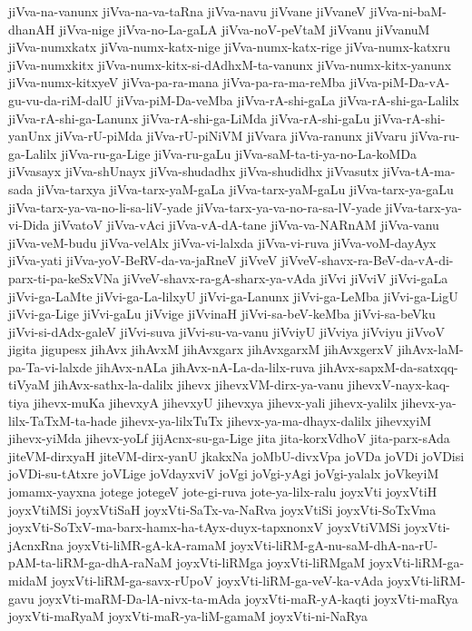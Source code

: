 {jiVva-na-vanunx
jiVva-na-va-taRna
jiVva-navu
jiVvane
jiVvaneV
jiVva-ni-baM-dhanAH
jiVva-nige
jiVva-no-La-gaLA
jiVva-noV-peVtaM
jiVvanu
jiVvanuM
jiVva-numxkatx
jiVva-numx-katx-nige
jiVva-numx-katx-rige
jiVva-numx-katxru
jiVva-numxkitx
jiVva-numx-kitx-si-dAdhxM-ta-vanunx
jiVva-numx-kitx-yanunx
jiVva-numx-kitxyeV
jiVva-pa-ra-mana
jiVva-pa-ra-ma-reMba
jiVva-piM-Da-vA-gu-vu-da-riM-dalU
jiVva-piM-Da-veMba
jiVva-rA-shi-gaLa
jiVva-rA-shi-ga-Lalilx
jiVva-rA-shi-ga-Lanunx
jiVva-rA-shi-ga-LiMda
jiVva-rA-shi-gaLu
jiVva-rA-shi-yanUnx
jiVva-rU-piMda
jiVva-rU-piNiVM
jiVvara
jiVva-ranunx
jiVvaru
jiVva-ru-ga-Lalilx
jiVva-ru-ga-Lige
jiVva-ru-gaLu
jiVva-saM-ta-ti-ya-no-La-koMDa
jiVvasayx
jiVva-shUnayx
jiVva-shudadhx
jiVva-shudidhx
jiVvasutx
jiVva-tA-ma-sada
jiVva-tarxya
jiVva-tarx-yaM-gaLa
jiVva-tarx-yaM-gaLu
jiVva-tarx-ya-gaLu
jiVva-tarx-ya-va-no-li-sa-liV-yade
jiVva-tarx-ya-va-no-ra-sa-lV-yade
jiVva-tarx-ya-vi-Dida
jiVvatoV
jiVva-vAci
jiVva-vA-dA-tane
jiVva-va-NARnAM
jiVva-vanu
jiVva-veM-budu
jiVva-velAlx
jiVva-vi-lalxda
jiVva-vi-ruva
jiVva-voM-dayAyx
jiVva-yati
jiVva-yoV-BeRV-da-va-jaRneV
jiVveV
jiVveV-shavx-ra-BeV-da-vA-di-parx-ti-pa-keSxVNa
jiVveV-shavx-ra-gA-sharx-ya-vAda
jiVvi
jiVviV
jiVvi-gaLa
jiVvi-ga-LaMte
jiVvi-ga-La-lilxyU
jiVvi-ga-Lanunx
jiVvi-ga-LeMba
jiVvi-ga-LigU
jiVvi-ga-Lige
jiVvi-gaLu
jiVvige
jiVvinaH
jiVvi-sa-beV-keMba
jiVvi-sa-beVku
jiVvi-si-dAdx-galeV
jiVvi-suva
jiVvi-su-va-vanu
jiVviyU
jiVviya
jiVviyu
jiVvoV
jigita
jigupesx
jihAvx
jihAvxM
jihAvxgarx
jihAvxgarxM
jihAvxgerxV
jihAvx-laM-pa-Ta-vi-lalxde
jihAvx-nALa
jihAvx-nA-La-da-lilx-ruva
jihAvx-sapxM-da-satxqq-tiVyaM
jihAvx-sathx-la-dalilx
jihevx
jihevxVM-dirx-ya-vanu
jihevxV-nayx-kaq-tiya
jihevx-muKa
jihevxyA
jihevxyU
jihevxya
jihevx-yali
jihevx-yalilx
jihevx-ya-lilx-TaTxM-ta-hade
jihevx-ya-lilxTuTx
jihevx-ya-ma-dhayx-dalilx
jihevxyiM
jihevx-yiMda
jihevx-yoLf
jijAcnx-su-ga-Lige
jita
jita-korxVdhoV
jita-parx-sAda
jiteVM-dirxyaH
jiteVM-dirx-yanU
jkakxNa
joMbU-divxVpa
joVDa
joVDi
joVDisi
joVDi-su-tAtxre
joVLige
joVdayxviV
joVgi
joVgi-yAgi
joVgi-yalalx
joVkeyiM
jomamx-yayxna
jotege
jotegeV
jote-gi-ruva
jote-ya-lilx-ralu
joyxVti
joyxVtiH
joyxVtiMSi
joyxVtiSaH
joyxVti-SaTx-va-NaRva
joyxVtiSi
joyxVti-SoTxVma
joyxVti-SoTxV-ma-barx-hamx-ha-tAyx-duyx-tapxnonxV
joyxVtiVMSi
joyxVti-jAcnxRna
joyxVti-liMR-gA-kA-ramaM
joyxVti-liRM-gA-nu-saM-dhA-na-rU-pAM-ta-liRM-ga-dhA-raNaM
joyxVti-liRMga
joyxVti-liRMgaM
joyxVti-liRM-ga-midaM
joyxVti-liRM-ga-savx-rUpoV
joyxVti-liRM-ga-veV-ka-vAda
joyxVti-liRM-gavu
joyxVti-maRM-Da-lA-nivx-ta-mAda
joyxVti-maR-yA-kaqti
joyxVti-maRya
joyxVti-maRyaM
joyxVti-maR-ya-liM-gamaM
joyxVti-ni-NaRya
}
